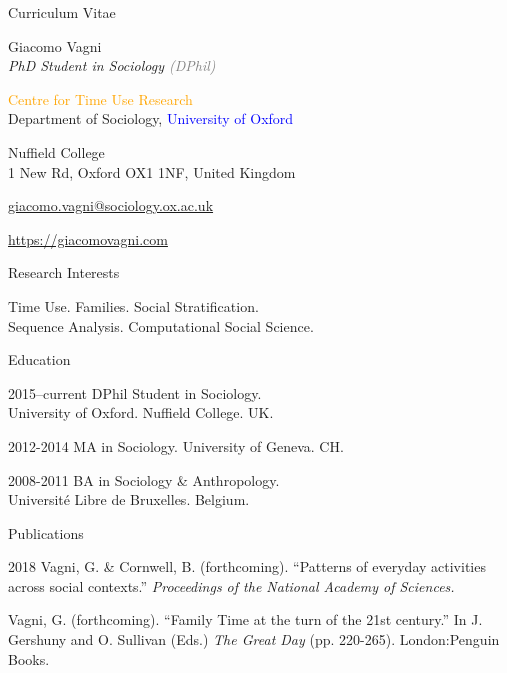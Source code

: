 \documentclass[10pt,a4paper]{article}
\begin{document}
\begin{cv}{Curriculum Vitae}
  \begin{cvlist}{}
  \item \colorbox{mygray} {Giacomo Vagni}\\
  \emph{PhD Student in Sociology \textcolor{Gray}{(DPhil)}}
  
    \textcolor{Orange} {Centre for Time Use Research} \\
     Department of Sociology, \textcolor{Blue}{University of Oxford} 
    \item Nuffield College \\ 
    1 New Rd, Oxford OX1 1NF, United Kingdom
  \item \href{mailto:giacomo.vagni@sociology.ox.ac.uk}{giacomo.vagni@sociology.ox.ac.uk}
    
    \item \href{https://giacomovagni.com} {https://giacomovagni.com} \\
    
  \end{cvlist}
  
  \begin{cvlist}{Research Interests}
  \item[] Time Use. Families. Social Stratification. \\  Sequence Analysis. Computational Social Science.
  \end{cvlist}
  
  \begin{cvlist}{Education}
  \item[2015--current] DPhil Student in Sociology. \\ University of Oxford. Nuffield College. UK. 
  \item[2012-2014] MA in Sociology. University of Geneva. CH. 
  \item[2008-2011] BA in Sociology \& Anthropology. \\ Universit{\'e} Libre de Bruxelles. Belgium. 
  \end{cvlist}
  
 
   \begin{cvlist}{Publications}
	
	\item [2018] Vagni, G. \& Cornwell, B. (forthcoming). ``Patterns of everyday activities across social contexts.'' \emph{Proceedings of the National Academy of Sciences.}
			 
   	 \item [] Vagni, G. (forthcoming). ``Family Time at the turn of the 21st century.'' In J. Gershuny and O. Sullivan (Eds.) \emph{The Great Day} (pp. 220-265). London:Penguin Books.  
   	 

\end{cvlist}
\end{cv}
\end{document}
